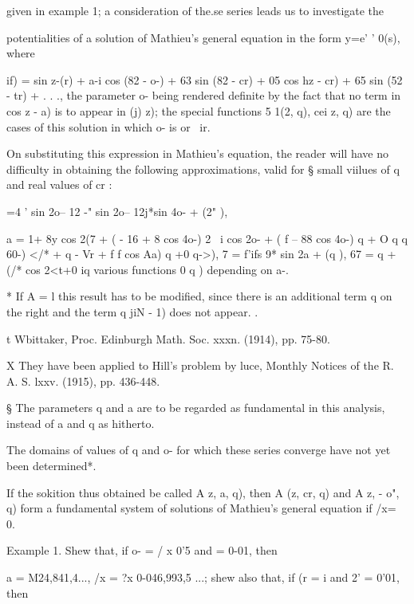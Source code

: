 {{given in  example 1; a consideration of the.se series leads us
to investigate the

potentialities of a solution of Mathieu's general equation in the form
y=e' ' 0(s), where

  if) = sin z-(r) + a-i cos (82 - o-) + 63 sin (82 - cr) + 05 cos hz -
cr) + 65 sin (52 - tr) + . . ., the parameter o- being rendered
definite by the fact that no term in cos z - a) is to appear in (j)
z); the special functions 5 1(2, q), cei z, q) are the cases of this
solution in which o- is or \ ir.

On substituting this expression in Mathieu's equation, the reader will
have no difficulty in obtaining the following approximations, valid
for § small viilues of q and real values of cr :

  =4 ' sin 2o-- 12 -" sin 2o-- 12j*sin 4o- + (2" ),

a = 1+ 8y cos 2(7 + ( - 16 + 8 cos 4o-) 2 \ i cos 2o- + ( f -- 88 cos
4o-) q + O q%
q%
60-) </* + q%
- Vr + f f cos Aa) q +0 q->), 7 = f'ifs 9* sin 2a + (q ), 67 = q + (/*
cos 2<t+0 iq%
various functions 0 q ) depending on a-.

* If A = l this result has to be modified, since there is an
additional term q on the right and the term q jiN - 1) does not
appear. .

t Wbittaker, Proc. Edinburgh Math. Soc. xxxn. (1914), pp. 75-80.

X They have been applied to Hill's problem by luce, Monthly Notices of
the R. A. S. lxxv. (1915), pp. 436-448.

§ The parameters q and a are to be regarded as fundamental in this
analysis, instead of a and q as hitherto.

%
%

The domains of values of q and o- for which these series converge have
not yet been determined*.

If the sokition thus obtained be called A z, a, q), then A (z, cr, q)
and A z, - o", q) form a fundamental system of solutions of Mathieu's
general equation if /x= 0.

Example 1. Shew that, if o- = / x 0'5 and = 0-01, then

a = M24,841,4..., /x = ?x 0-046,993,5 ...; shew also that, if (r = i
and 2' = 0'01, then

}}
